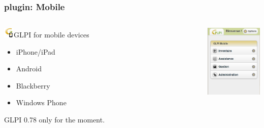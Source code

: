 \documentclass{beamer}
\begin{document}
\begin{frame}
    \frametitle{plugin: Mobile}
 \begin{columns}
 \begin{column}{0.55\textwidth}
    \begin{block}{\includegraphics[height=0.5cm]{./pics/plugins/mobile.jpg}GLPI for mobile devices}
        \begin{itemize}
            \item iPhone/iPad
            \item Android
            \item Blackberry
            \item Windows Phone
        \end{itemize}
        GLPI 0.78 only for the moment.
    \end{block}

 \end{column}
 \begin{column}{0.1\textwidth}
 \end{column}
    \includegraphics[height=3.5cm]{./pics/mobile/central.jpg}

\end{columns}



\end{frame}
\end{document}
